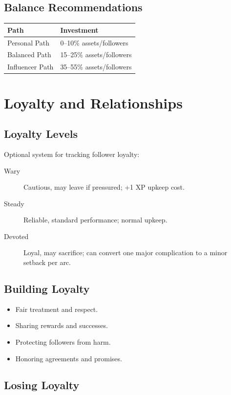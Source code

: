 \documentclass[11pt,twoside,openany]{book}
\begin{document}
\subsection*{Balance Recommendations}

\begin{center}
\begin{tabular}{|l|l|}
\hline
\textbf{Path} & \textbf{Investment} \\
\hline
Personal Path & 0--10\% assets/followers \\
Balanced Path & 15--25\% assets/followers \\
Influencer Path & 35--55\% assets/followers \\
\hline
\end{tabular}
\end{center}

\section*{Loyalty and Relationships} 

\subsection*{Loyalty Levels}

Optional system for tracking follower loyalty:
\begin{description}
\item[Wary] Cautious, may leave if pressured; +1 XP upkeep cost.
\item[Steady] Reliable, standard performance; normal upkeep.
\item[Devoted] Loyal, may sacrifice; can convert one major complication to a minor setback per arc.
\end{description}

\subsection*{Building Loyalty}

\begin{itemize}
\item Fair treatment and respect.
\item Sharing rewards and successes.
\item Protecting followers from harm.
\item Honoring agreements and promises.
\end{itemize}

\subsection*{Losing Loyalty}
\end{document}
